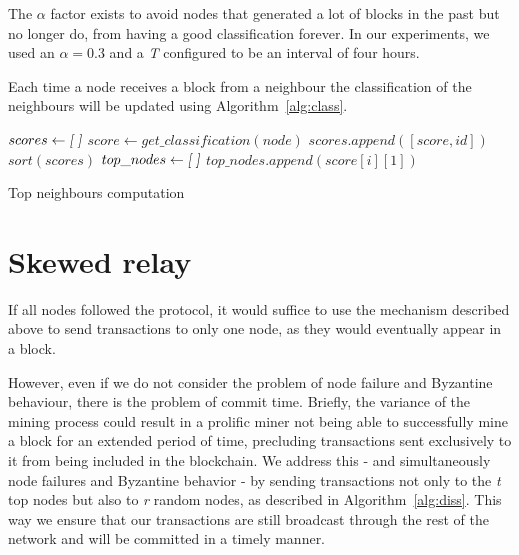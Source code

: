 The $\alpha$ factor exists to avoid nodes that generated a lot of blocks in the past but no longer do, from having a good classification forever. In our experiments, we used an $\alpha=0.3$ and a \textit{T} configured to be an interval of four hours.

Each time a node receives a block from a neighbour the classification of the neighbours will be updated using Algorithm~\ref{alg:class}.

\begin{algorithm}[t]
\begin{algorithmic}[1]
\State $scores \gets \textsl{[ ]}$
  \State $score \gets get\_classification(node)$
  \State $scores.append([score, id])$
\EndFor
\State $sort(scores)$
\State $top\_nodes \gets \textsl{[ ]}$
  \State $top\_nodes.append(score[i][1])$
\EndFor
\EndFunction
\end{algorithmic}
\caption{Top neighbours computation}
\label{alg:class}
\end{algorithm}

\section{Skewed relay}
\label{sec:sr}

If all nodes followed the protocol, it would suffice to use the mechanism described above to send
transactions to only one node, as they would eventually appear in a block.

However, even if we do not consider the problem of node failure and Byzantine behaviour, there is the problem of commit time.
Briefly, the variance of the mining process could result in a prolific miner not being able to successfully mine a block for an extended period of time, precluding transactions sent exclusively to it from being included in the blockchain.
We address this - and simultaneously node failures and Byzantine behavior - by sending transactions not only to the \textsl{t} top nodes but also to \textsl{r} random nodes, as described in Algorithm~\ref{alg:diss}. This way we ensure that our transactions are still broadcast through the rest of the network and will be committed in a timely manner.


